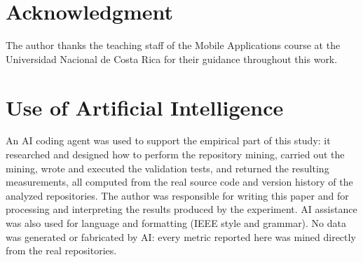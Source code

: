 \documentclass[conference]{IEEEtran}
\begin{document}
\section*{Acknowledgment}
The author thanks the teaching staff of the Mobile Applications course at the
Universidad Nacional de Costa Rica for their guidance throughout this work.

\section*{Use of Artificial Intelligence}
An AI coding agent was used to support the empirical part of this study: it
researched and designed how to perform the repository mining, carried out the
mining, wrote and executed the validation tests, and returned the resulting
measurements, all computed from the real source code and version history of the
analyzed repositories. The author was responsible for writing this paper and for
processing and interpreting the results produced by the experiment. AI assistance
was also used for language and formatting (IEEE style and grammar). No data was
generated or fabricated by AI: every metric reported here was mined directly from
the real repositories.
\end{document}
